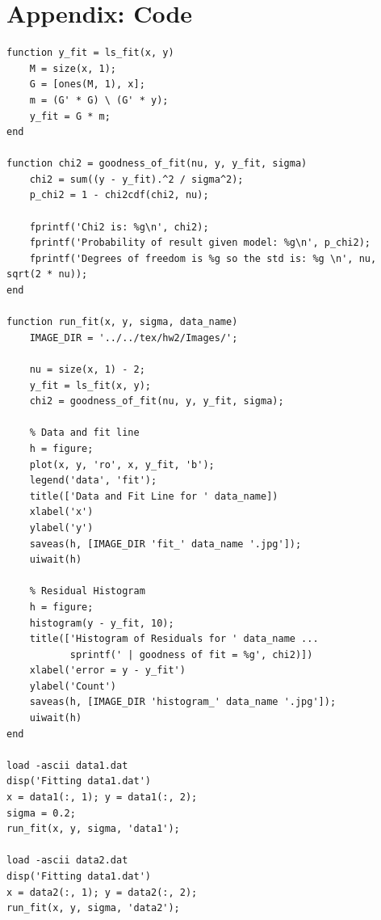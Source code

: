 \documentclass{homework}
\begin{document}
\section{Appendix: Code}


\begin{lstlisting}
function y_fit = ls_fit(x, y)
    M = size(x, 1);
    G = [ones(M, 1), x];
    m = (G' * G) \ (G' * y);
    y_fit = G * m;
end

function chi2 = goodness_of_fit(nu, y, y_fit, sigma)
    chi2 = sum((y - y_fit).^2 / sigma^2);
    p_chi2 = 1 - chi2cdf(chi2, nu);
    
    fprintf('Chi2 is: %g\n', chi2);
    fprintf('Probability of result given model: %g\n', p_chi2);
    fprintf('Degrees of freedom is %g so the std is: %g \n', nu, sqrt(2 * nu));
end

function run_fit(x, y, sigma, data_name)
    IMAGE_DIR = '../../tex/hw2/Images/';

    nu = size(x, 1) - 2;
    y_fit = ls_fit(x, y);
    chi2 = goodness_of_fit(nu, y, y_fit, sigma);

    % Data and fit line
    h = figure;
    plot(x, y, 'ro', x, y_fit, 'b');
    legend('data', 'fit');
    title(['Data and Fit Line for ' data_name])
    xlabel('x')
    ylabel('y')
    saveas(h, [IMAGE_DIR 'fit_' data_name '.jpg']);
    uiwait(h)

    % Residual Histogram
    h = figure;
    histogram(y - y_fit, 10);
    title(['Histogram of Residuals for ' data_name ...
           sprintf(' | goodness of fit = %g', chi2)])
    xlabel('error = y - y_fit')
    ylabel('Count')
    saveas(h, [IMAGE_DIR 'histogram_' data_name '.jpg']);
    uiwait(h)
end

load -ascii data1.dat
disp('Fitting data1.dat')
x = data1(:, 1); y = data1(:, 2);
sigma = 0.2;
run_fit(x, y, sigma, 'data1');

load -ascii data2.dat
disp('Fitting data1.dat')
x = data2(:, 1); y = data2(:, 2);
run_fit(x, y, sigma, 'data2');



\end{lstlisting}
    
\end{document}
